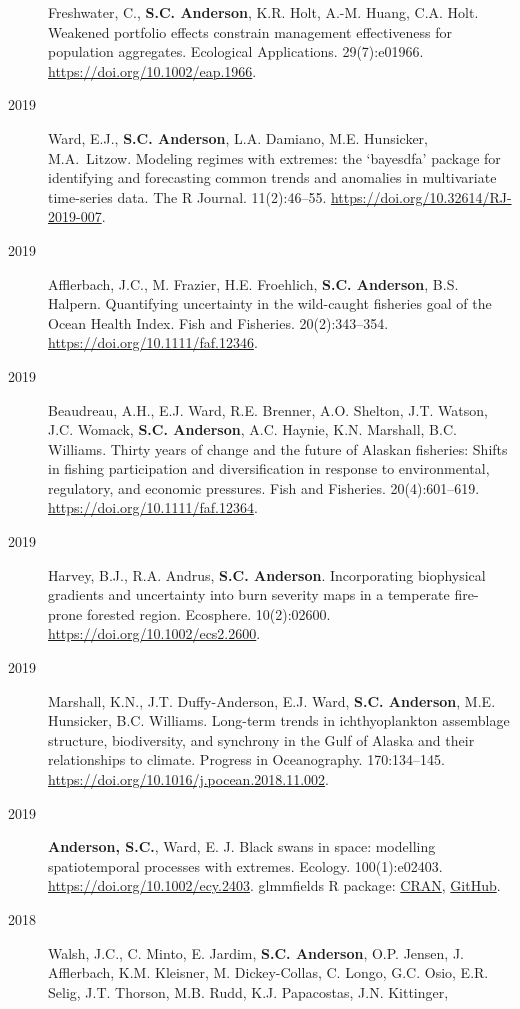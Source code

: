 \begin{description}
Freshwater, C., \textbf{S.C. Anderson}, K.R. Holt, A.-M. Huang, C.A.
Holt. Weakened portfolio effects constrain management effectiveness for
population aggregates. Ecological Applications. 29(7):e01966.
\url{https://doi.org/10.1002/eap.1966}.
\item[2019]
Ward, E.J., \textbf{S.C. Anderson}, L.A. Damiano, M.E. Hunsicker,
M.A.\ Litzow. Modeling regimes with extremes: the `bayesdfa' package for
identifying and forecasting common trends and anomalies in multivariate
time-series data. The R Journal. 11(2):46--55.
\url{https://doi.org/10.32614/RJ-2019-007}.
\item[2019]
Afflerbach, J.C., M. Frazier, H.E. Froehlich, \textbf{S.C. Anderson},
B.S. Halpern. Quantifying uncertainty in the wild-caught fisheries goal
of the Ocean Health Index. Fish and Fisheries. 20(2):343--354.
\url{https://doi.org/10.1111/faf.12346}.
\item[2019]
Beaudreau, A.H., E.J. Ward, R.E. Brenner, A.O. Shelton, J.T. Watson,
J.C. Womack, \textbf{S.C. Anderson}, A.C. Haynie, K.N. Marshall, B.C.
Williams. Thirty years of change and the future of Alaskan fisheries:
Shifts in fishing participation and diversification in response to
environmental, regulatory, and economic pressures. Fish and Fisheries.
20(4):601--619. \url{https://doi.org/10.1111/faf.12364}.
\item[2019]
Harvey, B.J., R.A. Andrus, \textbf{S.C. Anderson}. Incorporating
biophysical gradients and uncertainty into burn severity maps in a
temperate fire-prone forested region. Ecosphere. 10(2):02600.
\url{https://doi.org/10.1002/ecs2.2600}.
\item[2019]
Marshall, K.N., J.T. Duffy-Anderson, E.J. Ward, \textbf{S.C. Anderson},
M.E. Hunsicker, B.C. Williams. Long-term trends in ichthyoplankton
assemblage structure, biodiversity, and synchrony in the Gulf of Alaska
and their relationships to climate. Progress in Oceanography.
170:134--145. \url{https://doi.org/10.1016/j.pocean.2018.11.002}.
\item[2019]
\textbf{Anderson, S.C.}, Ward, E. J. Black swans in space: modelling
spatiotemporal processes with extremes. Ecology. 100(1):e02403.
\url{https://doi.org/10.1002/ecy.2403}. glmmfields R package:
\href{https://cran.r-project.org/package=glmmfields}{CRAN},
\href{https://github.com/seananderson/glmmfields}{GitHub}.
\item[2018]
Walsh, J.C., C. Minto, E. Jardim, \textbf{S.C. Anderson}, O.P. Jensen,
J. Afflerbach, K.M. Kleisner, M. Dickey-Collas, C. Longo, G.C. Osio,
E.R. Selig, J.T. Thorson, M.B. Rudd, K.J. Papacostas, J.N. Kittinger,

\end{description}

